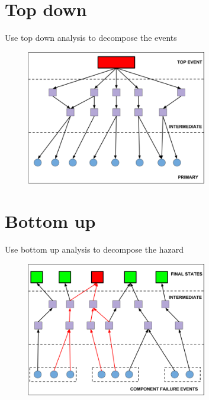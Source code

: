 \documentclass[aspectratio=1610,pdftex,dvipsnames,compress,xcolor={dvipsnames}]{beamer}
\begin{document}
\section{Top down}


\addtocounter{framenumber}{-1}
\begin{frame}{Use top down analysis to decompose the events}
    \begin{figure}
        \centering
        \includegraphics[width=0.70\textwidth]{top.down.jpg}
    \end{figure}
\end{frame}


\section{Bottom up}


\addtocounter{framenumber}{-1}
\begin{frame}{Use bottom up analysis to decompose the hazard}
    \begin{figure}
        \centering
        \includegraphics[width=0.70\textwidth]{bottom.up.jpg}
    \end{figure}
\end{frame}
\end{document}
